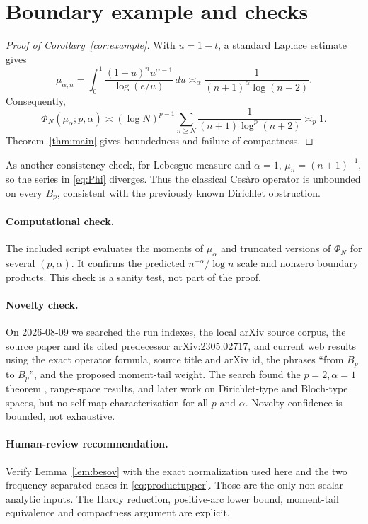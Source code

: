 \documentclass[11pt]{article}
\begin{document}
\section{Boundary example and checks}

\begin{proof}[Proof of Corollary~\ref{cor:example}]
With \(u=1-t\), a standard Laplace estimate gives
\[
 \mu_{\alpha,n}
 =\int_0^1\frac{(1-u)^nu^{\alpha-1}}{\log(e/u)}\,du
 \asymp_\alpha\frac{1}{(n+1)^\alpha\log(n+2)}.
\]
Consequently,
\[
 \Phi_N(\mu_\alpha;p,\alpha)
 \asymp
 (\log N)^{p-1}
 \sum_{n\geq N}\frac{1}{(n+1)\log^p(n+2)}
 \asymp_p1.
\]
Theorem~\ref{thm:main} gives boundedness and failure of compactness.
\end{proof}

As another consistency check, for Lebesgue measure and \(\alpha=1\),
\(\mu_n=(n+1)^{-1}\), so the series in \eqref{eq:Phi} diverges.  Thus the
classical Ces\`aro operator is unbounded on every \(B_p\), consistent with
the previously known Dirichlet obstruction.

\paragraph{Computational check.}
The included script evaluates the moments of \(\mu_\alpha\) and truncated
versions of \(\Phi_N\) for several \((p,\alpha)\).  It confirms the predicted
\(n^{-\alpha}/\log n\) scale and nonzero boundary products.  This check is a
sanity test, not part of the proof.

\paragraph{Novelty check.}
On 2026-08-09 we searched the run indexes, the local arXiv source corpus, the
source paper and its cited predecessor arXiv:2305.02717, and current web
results using the exact operator formula, source title and arXiv id, the
phrases ``from \(B_p\) to \(B_p\)'', and the proposed moment-tail weight.
The search found the \(p=2,\alpha=1\) theorem \cite{BGSW}, range-space
results, and later work on Dirichlet-type and Bloch-type spaces, but no
self-map characterization for all \(p\) and \(\alpha\).  Novelty confidence
is bounded, not exhaustive.

\paragraph{Human-review recommendation.}
Verify Lemma~\ref{lem:besov} with the exact normalization used here and the
two frequency-separated cases in \eqref{eq:productupper}.  Those are the
only non-scalar analytic inputs.  The Hardy reduction, positive-arc lower
bound, moment-tail equivalence and compactness argument are explicit.
\end{document}
